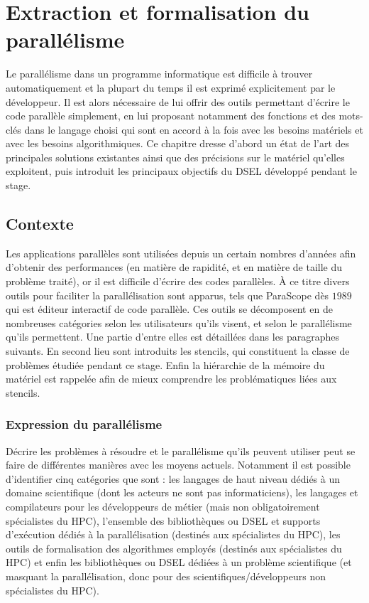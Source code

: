 
\chapter{Extraction et formalisation du parallélisme}

Le parallélisme dans un programme informatique est difficile à trouver automatiquement et la plupart du temps il est exprimé explicitement par le développeur. Il est alors nécessaire de lui offrir des outils permettant d'écrire le code parallèle simplement, en lui proposant notamment des fonctions et des mots-clés dans le langage choisi qui sont en accord à la fois avec les besoins matériels et avec les besoins algorithmiques. Ce chapitre dresse d'abord un état de l'art des principales solutions existantes ainsi que des précisions sur le matériel qu'elles exploitent, puis introduit les principaux objectifs du DSEL développé pendant le stage.

\section{Contexte}

Les applications parallèles sont utilisées depuis un certain nombres d'années afin d'obtenir des performances (en matière de rapidité, et en matière de taille du problème traité), or il est difficile d'écrire des codes parallèles. À ce titre divers outils pour faciliter la parallélisation sont apparus, tels que \textsf{ParaScope} dès $1989$ \cite{Art24} qui est éditeur interactif de code parallèle. Ces outils se décomposent en de nombreuses catégories selon les utilisateurs qu'ils visent, et selon le parallélisme qu'ils permettent. Une partie d'entre elles est détaillées dans les paragraphes suivants. En second lieu sont introduits les stencils, qui constituent la classe de problèmes étudiée pendant ce stage. Enfin la hiérarchie de la mémoire du matériel est rappelée afin de mieux comprendre les problématiques liées aux stencils.

\subsection{Expression du parallélisme}
\label{sec:biblio}

Décrire les problèmes à résoudre et le parallélisme qu'ils peuvent utiliser peut se faire de différentes manières avec les moyens actuels. Notamment il est possible d'identifier cinq catégories que sont : les langages de haut niveau dédiés à un domaine scientifique (dont les acteurs ne sont pas informaticiens), les langages et compilateurs pour les développeurs de métier (mais non obligatoirement spécialistes du HPC), l'ensemble des bibliothèques ou DSEL et supports d'exécution dédiés à la parallélisation (destinés aux spécialistes du HPC), les outils de formalisation des algorithmes employés (destinés aux spécialistes du HPC) et enfin les bibliothèques ou DSEL dédiées à un problème scientifique (et masquant la parallélisation, donc pour des scientifiques/développeurs non spécialistes du HPC).

